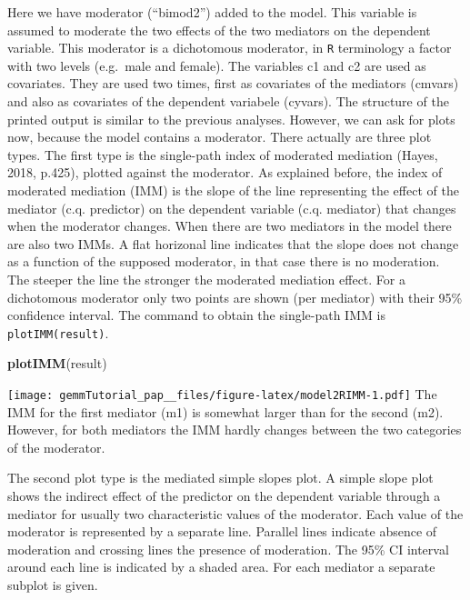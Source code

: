 \documentclass[man,floatsintext]{apa6}
\newenvironment{Shaded}{\begin{snugshade}}{\end{snugshade}}
\newcommand{\KeywordTok}[1]{\textcolor[rgb]{0.13,0.29,0.53}{\textbf{#1}}}
\newcommand{\NormalTok}[1]{#1}
\theoremstyle{definition}
\theoremstyle{definition}
\theoremstyle{definition}
\theoremstyle{remark}
\begin{document}
Here we have moderator (\enquote{bimod2}) added to the model. This
variable is assumed to moderate the two effects of the two mediators on
the dependent variable. This moderator is a dichotomous moderator, in
\texttt{R} terminology a factor with two levels (e.g.~male and female).
The variables c1 and c2 are used as covariates. They are used two times,
first as covariates of the mediators (cmvars) and also as covariates of
the dependent variabele (cyvars). The structure of the printed output is
similar to the previous analyses. However, we can ask for plots now,
because the model contains a moderator. There actually are three plot
types. The first type is the single-path index of moderated mediation
(Hayes, 2018, p.425), plotted against the moderator. As explained
before, the index of moderated mediation (IMM) is the slope of the line
representing the effect of the mediator (c.q. predictor) on the
dependent variable (c.q. mediator) that changes when the moderator
changes. When there are two mediators in the model there are also two
IMMs. A flat horizonal line indicates that the slope does not change as
a function of the supposed moderator, in that case there is no
moderation. The steeper the line the stronger the moderated mediation
effect. For a dichotomous moderator only two points are shown (per
mediator) with their 95\% confidence interval. The command to obtain the
single-path IMM is \texttt{plotIMM(result)}.

\begin{Shaded}
\begin{Highlighting}[]
\KeywordTok{plotIMM}\NormalTok{(result)}
\end{Highlighting}
\end{Shaded}

\texttt{[image: gemmTutorial\_pap\_\_files/figure-latex/model2RIMM-1.pdf]}
The IMM for the first mediator (m1) is somewhat larger than for the
second (m2). However, for both mediators the IMM hardly changes between
the two categories of the moderator.

The second plot type is the mediated simple slopes plot. A simple slope
plot shows the indirect effect of the predictor on the dependent
variable through a mediator for usually two characteristic values of the
moderator. Each value of the moderator is represented by a separate
line. Parallel lines indicate absence of moderation and crossing lines
the presence of moderation. The 95\% CI interval around each line is
indicated by a shaded area. For each mediator a separate subplot is
given.
\end{document}

